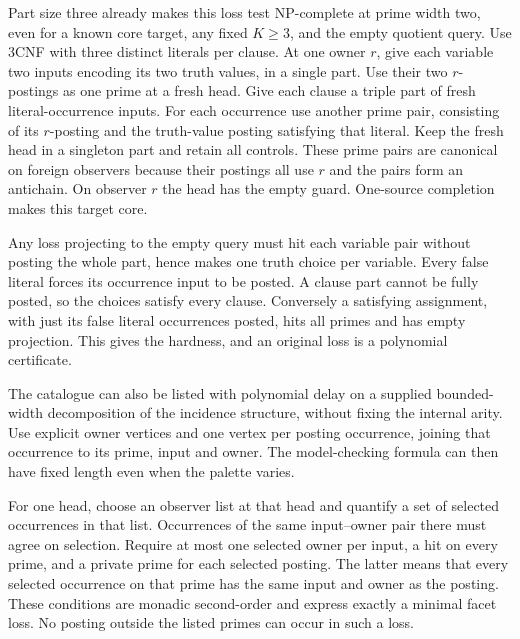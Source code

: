 Part size three already makes this loss
test NP-complete at prime width two, even
for a known core target, any fixed
$K\geq3$, and the empty quotient query.
Use 3CNF with three distinct literals
per clause. At one owner $r$, give each
variable two inputs encoding its two
truth values, in a single part. Use their
two $r$-postings as one prime at a fresh
head. Give each clause a triple part of
fresh literal-occurrence inputs. For each
occurrence use another prime pair,
consisting of its $r$-posting and the
truth-value posting satisfying that
literal. Keep the fresh head in a
singleton part and retain all controls.
These prime pairs are canonical on
foreign observers because their postings
all use $r$ and the pairs form an
antichain. On observer $r$ the head has
the empty guard. One-source completion
makes this target core.

Any loss projecting to the empty query
must hit each variable pair without
posting the whole part, hence makes
one truth choice per variable. Every
false literal forces its occurrence
input to be posted. A clause part
cannot be fully posted, so the choices
satisfy every clause. Conversely a
satisfying assignment, with just its
false literal occurrences posted, hits
all primes and has empty projection.
This gives the hardness, and an original
loss is a polynomial certificate.

The catalogue can also be listed with
polynomial delay on a supplied bounded-width
decomposition of the incidence structure,
without fixing the internal arity. Use explicit
owner vertices and one vertex per posting
occurrence, joining that occurrence to its
prime, input and owner. The model-checking
formula can then have fixed length even
when the palette varies.

For one head, choose an observer list
at that head and quantify a set of
selected occurrences in that list. Occurrences of the same input--owner
pair there must agree on selection. Require
at most one selected owner per input, a hit
on every prime, and a private prime for each
selected posting. The latter means that
every selected occurrence on that prime
has the same input and owner as the posting.
These conditions are monadic second-order
and express exactly a minimal facet loss.
No posting outside the listed primes
can occur in such a loss.

